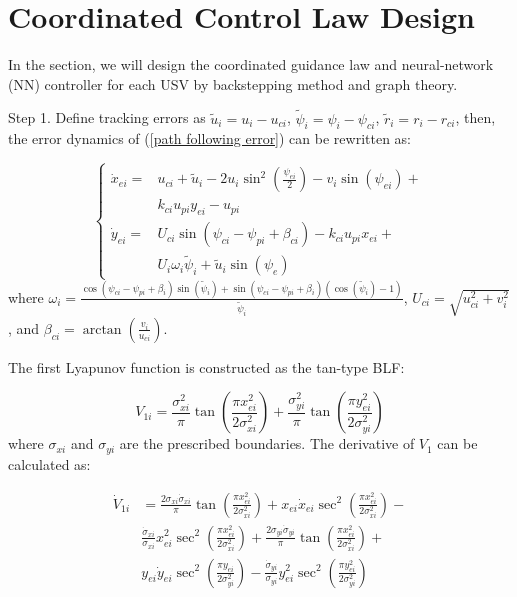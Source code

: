 \documentclass[conference,letterpaper,10.5pt]{IEEEtran}
\begin{document}
\section{Coordinated Control Law Design}

In the section, we will design the coordinated guidance law and neural-network (NN) controller for each USV by backstepping method and graph theory.

Step 1. Define tracking errors as $\tilde{u}_i=u_i-u_{ci}$, $\tilde{\psi}_i=\psi_i-\psi_{ci}$, $\tilde{r}_i=r_i-r_{ci}$, then, the error dynamics of (\ref{path following error}) can be rewritten as:

\begin{equation}\label{path following error dynamics 1}
	\left\{
	\begin{aligned}
		\dot{x}_{ei}=&u_{ci}+\tilde{u}_i-2u_i\sin^2(\frac{\psi_{ei}}{2})-v_i\sin(\psi_{ei})+\\&k_{ci}u_{pi}y_{ei}-u_{pi}\\
		\dot{y}_{ei}=&U_{ci}\sin(\psi_{ci}-\psi_{pi}+\beta_{ci})-k_{ci}u_{pi}x_{ei}+\\&U_i\omega_i\tilde{\psi}_i+\tilde{u}_i\sin(\psi_{e})
	\end{aligned}
	\right.
\end{equation}
where $\omega_i=\frac{\cos(\psi_{ci}-\psi_{pi}+\beta_i)\sin(\tilde{\psi}_i)+\sin(\psi_{ci}-\psi_{pi}+\beta_i)(\cos(\tilde{\psi}_i)-1)}{\tilde{\psi}_i}$, $U_{ci}=\sqrt{u^2_{ci}+v^2_{i}}$, and $\beta_{ci}=\arctan({\frac{v_i}{u_{ci}}})$.

The first Lyapunov function is constructed as the tan-type BLF:

\begin{equation}\label{V1}
	V_{1i}=\frac{\sigma^2_{xi}}{\pi}\tan(\frac{\pi x_{ei}^2}{2\sigma^2_{xi}})+\frac{\sigma^2_{yi}}{\pi}\tan(\frac{\pi y_{ei}^2}{2\sigma^2_{yi}})
\end{equation}
where $\sigma_{xi}$ and $\sigma_{yi}$ are the prescribed boundaries.  The derivative of $V_1$ can be calculated as:

\begin{equation}\label{V1dot0}
	\begin{aligned}
		\dot{V}_{1i}&=\frac{2\sigma_{xi}\dot{\sigma}_{xi}}{\pi}\tan(\frac{\pi x_{ei}^2}{2\sigma^2_{xi}})+x_{ei}\dot{x}_{ei}\sec^2(\frac{\pi x_{ei}^2}{2\sigma^2_{xi}})-\\
		&\frac{\dot{\sigma}_{xi}}{\sigma_{xi}}x^2_{ei}\sec^2(\frac{\pi x_{ei}^2}{2\sigma^2_{xi}})+\frac{2\sigma_{yi}\dot{\sigma}_{yi}}{\pi}\tan(\frac{\pi x_{ei}^2}{2\sigma^2_{xi}})+\\
		&y_{ei}\dot{y}_{ei}\sec^2(\frac{\pi y_{ei}}{2\sigma^2_{yi}})-\frac{\dot{\sigma}_{yi}}{\sigma_{yi}}y^2_{ei}\sec^2(\frac{\pi y_{ei}^2}{2\sigma^2_{yi}})
	\end{aligned}
\end{equation}
\end{document}
